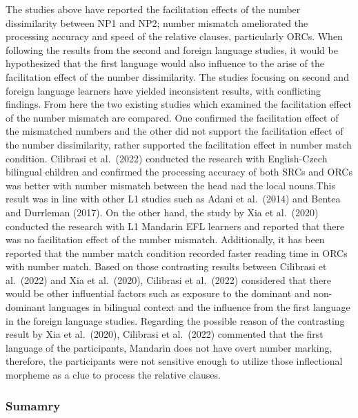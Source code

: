 \documentclass[
]{article}
\begin{document}
The studies above have reported the facilitation effects of the number
dissimilarity between NP1 and NP2; number mismatch ameliorated the
processing accuracy and speed of the relative clauses, particularly
ORCs. When following the results from the second and foreign language
studies, it would be hypothesized that the first language would also
influence to the arise of the facilitation effect of the number
dissimilarity. The studies focusing on second and foreign language
learners have yielded inconsistent results, with conflicting findings.
From here the two existing studies which examined the facilitation
effect of the number mismatch are compared. One confirmed the
facilitation effect of the mismatched numbers and the other did not
support the facilitation effect of the number dissimilarity, rather
supported the facilitation effect in number match condition. Cilibrasi
et al.~(2022) conducted the research with English-Czech bilingual
children and confirmed the processing accuracy of both SRCs and ORCs was
better with number mismatch between the head nad the local nouns.This
result was in line with other L1 studies such as Adani et al.~(2014) and
Bentea and Durrleman (2017). On the other hand, the study by Xia et
al.~(2020) conducted the research with L1 Mandarin EFL learners and
reported that there was no facilitation effect of the number mismatch.
Additionally, it has been reported that the number match condition
recorded faster reading time in ORCs with number match. Based on those
contrasting results between Cilibrasi et al.~(2022) and Xia et
al.~(2020), Cilibrasi et al.~(2022) considered that there would be other
influential factors such as exposure to the dominant and non-dominant
languages in bilingual context and the influence from the first language
in the foreign language studies. Regarding the possible reason of the
contrasting result by Xia et al.~(2020), Cilibrasi et al.~(2022)
commented that the first language of the participants, Mandarin does not
have overt number marking, therefore, the participants were not
sensitive enough to utilize those inflectional morpheme as a clue to
process the relative clauses.

\subsubsection{Sumamry}\label{sumamry}
\end{document}
